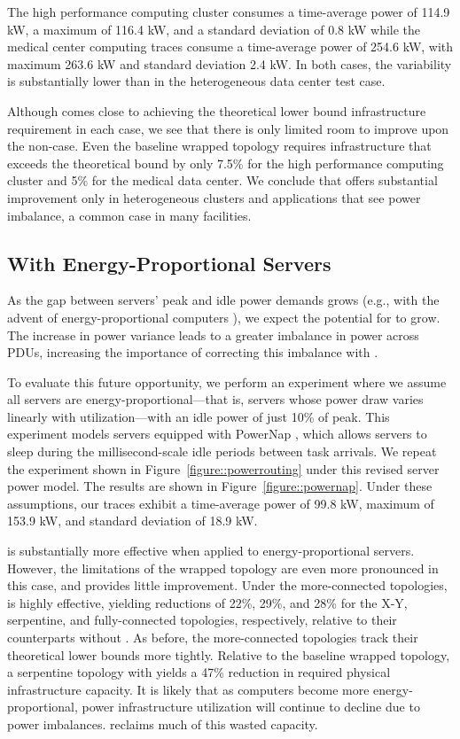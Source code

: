 The high performance computing cluster consumes a time-average power of 114.9 kW, a maximum of 116.4 kW, and a standard deviation of 0.8 kW while the medical center computing traces consume a time-average power of 254.6 kW, with maximum 263.6 kW and standard deviation 2.4 kW.  In both cases, the variability is substantially lower than in the heterogeneous data center test case.

Although \PowerRouting comes close to achieving the theoretical lower bound infrastructure requirement in each case, we see that there is only limited room to improve upon the non-\PowerRouting case. Even the baseline wrapped topology requires infrastructure that exceeds the theoretical bound by only 7.5\% for the high performance computing cluster and 5\% for the medical data center. We conclude that \PowerRouting offers substantial improvement only in heterogeneous clusters and applications that see power imbalance, a common case in many facilities.

\subsection{\PowerRouting With Energy-Proportional Servers}
As the gap between servers' peak and idle power demands grows  (e.g., with the advent of energy-proportional computers \cite{Barroso07}), we expect the potential for \PowerRouting to grow. The increase in power variance leads to a greater imbalance in power across PDUs, increasing the importance of correcting this imbalance with \PowerRouting.

To evaluate this future opportunity, we perform an experiment where we assume all servers are energy-proportional---that is, servers whose power draw varies linearly with utilization---with an idle power of just 10\% of peak.  This experiment models servers equipped with PowerNap \cite{Meisner09}, which allows servers to sleep during the millisecond-scale idle periods between task arrivals.  We repeat the experiment shown in Figure~\ref{figure::powerrouting} under this revised server power model. The results are shown in Figure~\ref{figure::powernap}.  Under these assumptions, our traces exhibit a time-average power of 99.8 kW, maximum of 153.9 kW, and standard deviation of 18.9 kW.

\PowerRouting is substantially more effective when applied to energy-proportional servers. 
However, the limitations of the wrapped topology are even more pronounced in this case, and \PowerRouting provides little improvement. Under the more-connected topologies, \PowerRouting is highly effective, yielding reductions of 22\%, 29\%, and 28\% for the X-Y, serpentine, and fully-connected topologies, respectively, relative to their counterparts without \PowerRouting.
As before, the more-connected topologies track their theoretical lower bounds more tightly.  Relative to the baseline wrapped topology, a serpentine topology with \PowerRouting yields a 47\% reduction in required physical infrastructure capacity. It is likely that as computers become more energy-proportional, power infrastructure utilization will continue to decline due to power imbalances.
\PowerRouting reclaims much of this wasted capacity.

